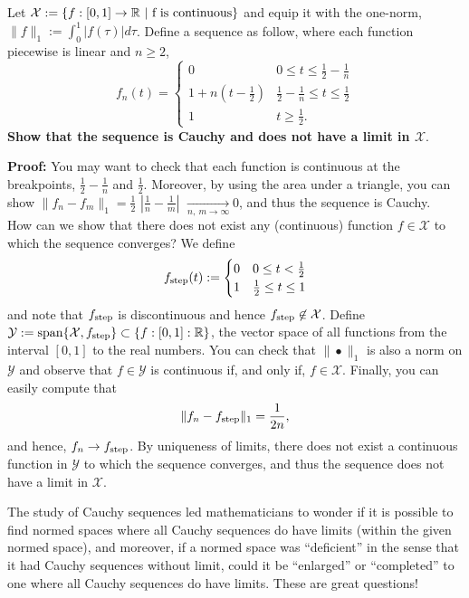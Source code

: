 \begin{example} Let $ \mathcal{X} :=  \{f:[0,1] \to \real \ \vert \ \textnormal{f is continuous}\}$ and equip it with the one-norm, $ \| f \|_1 := \int_0^1 \vert f(\tau)\vert d\tau$. Define a sequence as follow, where each function piecewise  is linear and $n \ge 2$,
    $$f_n(t)=\begin{cases}
        0 & 0\leq t\leq\frac{1}{2}-\frac{1}{n}\\
        1+n(t-\frac{1}{2}) & \frac{1}{2}-\frac{1}{n}\leq t\leq\frac{1}{2}\\
        1 & t\geq\frac{1}{2}.
    \end{cases}
    $$
    \textbf{Show that the sequence is Cauchy and does not have a limit in $ \mathcal{X}$}.
 
 \end{example} 
 
 \textbf{Proof:}  You may want to check that each function is continuous at the breakpoints, $\frac{1}{2}-\frac{1}{n}$ and $\frac{1}{2}$. Moreover, by using the area under a triangle, you can show
    $\| f_n - f_m \|_1=\frac{1}{2}$  $|\frac{1}{n}- \frac{1}{m}|$ $\xrightarrow[n,\ m \to \infty]{ }0$, and thus the sequence is Cauchy. \\
    
    
How can we show that there does not exist any (continuous) function $f \in \mathcal{X}$ to which the sequence converges? We define 
 $$f_{\rm step}(t):= \begin{cases} 0 & 0 \le  t < \frac{1}{2} \\ 1 &  \frac{1}{2} \le t \le 1 \end{cases}$$
 and note that $f_{\rm step}$ is discontinuous and hence $f_{\rm step} \not \in \mathcal{X}$. Define $\mathcal{Y}:=\mathrm{span} \{  \mathcal{X}, f_{\rm step} \} \subset \{ f:[0, 1] : \mathbb R \}$, the vector space of all functions from the interval $[0, 1]$ to the real numbers. You can check that $\| \bullet \|_1$ is also a norm on $\mathcal{Y}$ and observe that $f\in \mathcal{Y}$ is continuous if, and only if, $f\in \mathcal{X}$. Finally, you can easily compute that
 $$\|f_n - f_{\rm step} \|_1=\frac{1}{2n},$$ 
 and hence, $f_n \to f_{\rm step}$. By uniqueness of limits, there does not exist a continuous function in $\mathcal{Y}$ to which the sequence converges, and thus the sequence does not have a limit in $\mathcal{X}$. 
 
 \Qed

The study of Cauchy sequences led mathematicians to wonder if it is possible to find normed spaces where all Cauchy sequences do have limits (within the given normed space), and moreover, if a normed space was ``deficient'' in the sense that it had Cauchy sequences without limit, could it be ``enlarged'' or ``completed'' to one where all Cauchy sequences do have limits. These are great questions!

